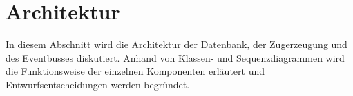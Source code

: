 \section{Architektur}

In diesem Abschnitt wird die Architektur der Datenbank, der Zugerzeugung und des Eventbusses diskutiert. Anhand von Klassen- und Sequenzdiagrammen wird die Funktionsweise der einzelnen Komponenten erläutert und Entwurfsentscheidungen werden begründet.





